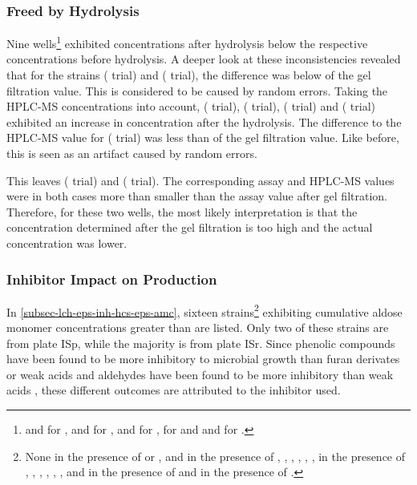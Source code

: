 \subsubsection{\GLC{} Freed by Hydrolysis\label{subsubsec-lch-eps-discussion-inh-hcs-glc-hydrolysis}}
Nine wells\footnote{ and  for \fur{},  and  for \hmf{},  and  for \van{},  for \acet{} and  and  for \laev{}.} %
exhibited \glc{} concentrations after hydrolysis below the respective concentrations before hydrolysis. A deeper look at these inconsistencies revealed that for the strains  (\fur{} trial) and  (\hmf{} trial), the difference was below  of the gel filtration value. This is considered to be caused by random errors. Taking the HPLC-MS \glc{} concentrations into account,  (\fur{} trial),  (\van{} trial),  (\acet{} trial) and  (\laev{} trial) exhibited an increase in \glc{} concentration after the hydrolysis. The difference to the HPLC-MS value for  (\van{} trial) was less than  of the gel filtration value. Like before, this is seen as an artifact caused by random errors.

This leaves  (\hmf{} trial) and  (\laev{} trial). The corresponding \glc{} assay and HPLC-MS \glc{} values were in both cases more than  smaller than the \glc{} assay value after gel filtration. Therefore, for these two wells, the most likely interpretation is that the concentration determined after the gel filtration is too high and the actual concentration was lower.

\subsubsection{Inhibitor Impact on \EPS{} Production\label{subsubsec-lch-eps-discussion-inh-hcs-inh-vs-eps-p}}
In \vref{subsec-lch-eps-inh-hcs-eps-amc}, sixteen strains\footnote{None in the presence of \fur{} or \van{},
 and  in the presence of \hmf{},
, , , , ,  in the presence of \acet{},
, , , , ,  and  in the presence of \fora{} and
 in the presence of \laev{}.} %
exhibiting cumulative \eps{} aldose monomer concentrations greater than  are listed. Only two of these strains are from plate ISp, while the majority is from plate ISr. Since phenolic compounds have been found to be more inhibitory to microbial growth than furan derivates or weak acids \cite{Clark1984, Jonsson1998, Larsson1999} and aldehydes have been found to be more inhibitory than weak acids \cite{Almeida2007, Zaldivar1999a, Zaldivar1999b, Zaldivar2000}, these different outcomes are attributed to the inhibitor used.

